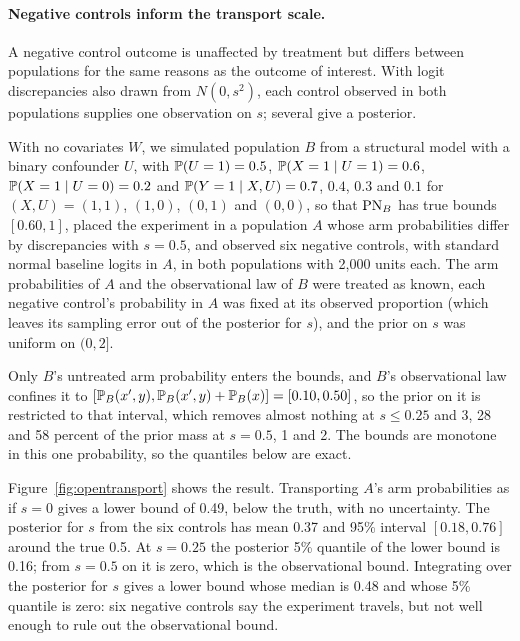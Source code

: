 \paragraph{Negative controls inform the transport scale.} A negative control outcome is unaffected by treatment but differs between populations for the same reasons as the outcome of interest. With logit discrepancies also drawn from $N(0, s^2)$, each control observed in both populations supplies one observation on $s$; several give a posterior.

With no covariates $W$, we simulated population $B$ from a structural model with a binary confounder $U$, with $\mathbb{P}(U = 1) = 0.5$, $\mathbb{P}(X = 1 \mid U = 1) = 0.6$, $\mathbb{P}(X = 1 \mid U = 0) = 0.2$ and $\mathbb{P}(Y = 1 \mid X, U) = 0.7$, $0.4$, $0.3$ and $0.1$ for $(X, U) = (1, 1)$, $(1, 0)$, $(0, 1)$ and $(0, 0)$, so that $\mathrm{PN}_B$ has true bounds $[0.60, 1]$, placed the experiment in a population $A$ whose arm probabilities differ by discrepancies with $s = 0.5$, and observed six negative controls, with standard normal baseline logits in $A$, in both populations with 2{,}000 units each. The arm probabilities of $A$ and the observational law of $B$ were treated as known, each negative control's probability in $A$ was fixed at its observed proportion (which leaves its sampling error out of the posterior for $s$), and the prior on $s$ was uniform on $(0, 2]$.

Only $B$'s untreated arm probability enters the bounds, and $B$'s observational law confines it to $[\mathbb{P}_B(x', y), \mathbb{P}_B(x', y) + \mathbb{P}_B(x)] = [0.10, 0.50]$, so the prior on it is restricted to that interval, which removes almost nothing at $s \le 0.25$ and 3, 28 and 58 percent of the prior mass at $s = 0.5$, 1 and 2. The bounds are monotone in this one probability, so the quantiles below are exact.

Figure~\ref{fig:opentransport} shows the result. Transporting $A$'s arm probabilities as if $s = 0$ gives a lower bound of 0.49, below the truth, with no uncertainty. The posterior for $s$ from the six controls has mean 0.37 and 95\% interval $[0.18, 0.76]$ around the true 0.5. At $s = 0.25$ the posterior 5\% quantile of the lower bound is 0.16; from $s = 0.5$ on it is zero, which is the observational bound. Integrating over the posterior for $s$ gives a lower bound whose median is 0.48 and whose 5\% quantile is zero: six negative controls say the experiment travels, but not well enough to rule out the observational bound.

